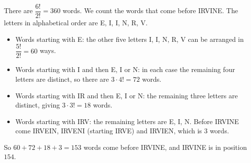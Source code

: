 There are $\dfrac{6!}{2!}=360$ words. We count the words that come before IRVINE. The letters in alphabetical order are E, I, I, N, R, V.
\begin{itemize}
\item Words starting with E: the other five letters I, I, N, R, V can be arranged in $\dfrac{5!}{2!}=60$ ways.
\item Words starting with I and then E, I or N: in each case the remaining four letters are distinct, so there are $3\cdot4!=72$ words.
\item Words starting with IR and then E, I or N: the remaining three letters are distinct, giving $3\cdot3!=18$ words.
\item Words starting with IRV: the remaining letters are E, I, N. Before IRVINE come IRVEIN, IRVENI (starting IRVE) and IRVIEN, which is $3$ words.
\end{itemize}
So $60+72+18+3=153$ words come before IRVINE, and IRVINE is in position $\boxed{154}$.
